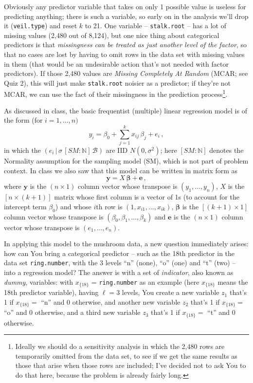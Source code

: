 \documentclass[12pt]{article}
\newcommand{\given}{\, | \,}
\begin{document}
Obviously any predictor variable that takes on only 1 possible value is useless for predicting anything; there is such a variable, so early on in the analysis we'll drop it (\texttt{veil.type}) and reset $k$ to 21. One variable -- \texttt{stalk.root} -- has a lot of missing values (2,480 out of 8,124), but one nice thing about categorical predictors is that \textit{missingness can be treated as just another level of the factor}, so that no cases are lost by having to omit rows in the data set with missing values in them (that would be an undesirable action that's not needed with factor predictors). If those 2,480 values are \textit{Missing Completely At Random} (MCAR; see Quiz 2), this will just make 
\texttt{stalk.root} noisier as a predictor; if they're not MCAR, we can use the fact of their missingness in the prediction process\footnote{Ideally we should do a sensitivity analysis in which the 2,480 rows are temporarily omitted from the data set, to see if we get the same results as those that arise when those rows are included; I've decided not to ask You to do that here, because the problem is already fairly long.}.

As discussed in class, the basic frequentist (multiple) linear regression model is of the form (for $i = 1, \dots, n )$
\begin{equation} \label{e:linear-regression-1}
y_i = \beta_0 + \sum_{ j = 1 }^k x_{ ij } \, \beta_j + e_i \, ,
\end{equation}
in which the $( e_i \given \sigma \, [ SM \! \! : \! \mathbb{ N } ] \, \mathcal{ B } )$ are IID $N ( 0, \sigma^2 )$; here $[ SM \! \! : \! \mathbb{ N } ]$ denotes the Normality assumption for the sampling model (SM), which is not part of problem context. In class we also saw that this model can be written in matrix form as
\begin{equation} \label{e:linear-regression-2}
\bm{ y } = X \, \bm{ \beta } + \bm{ e } \, ,
\end{equation} 
where $\bm{ y }$ is the $( n \times 1 )$ column vector whose transpose is $( y_1, \dots, y_n )$, $X$ is the $[ n \times ( k + 1 ) ]$ matrix whose first column is a vector of 1s (to account for the intercept term $\beta_0$) and whose $i$th row is $( 1, x_{ i1 }, \dots, x_{ ik } )$, $\bm{ \beta }$ is the $[ ( k + 1 ) \times 1 ]$ column vector whose transpose is $( \beta_0, \beta_1, \dots, \beta_k )$ and $\bm{ e }$ is the $( n \times 1 )$ column vector whose transpose is $( e_1, \dots, e_n )$. 

In applying this model to the mushroom data, a new question immediately arises: how can You bring a categorical predictor -- such as the 18th predictor in the data set \texttt{ring.number}, with the 3 levels ``n'' (none), ``o'' (one) and ``t'' (two) -- into a regression model? The answer is with a set of \textit{indicator}, also known as \textit{dummy}, variables: with $x_{ \{ 18 \} }$ = \texttt{ring.number} as an example (here $x_{ \{ 18 \} }$ means the 18th predictor variable), having $\ell = 3$ levels, You create a new variable $z_1$ that's 1 if $x_{ \{ 18 \} } =$ ``n'' and 0 otherwise, and another new variable $z_2$ that's 1 if $x_{ \{ 18 \} } =$ ``o'' and 0 otherwise, and a third new variable $z_3$ that's 1 if $x_{ \{ 18 \} } =$ ``t'' and 0 otherwise. 
\end{document}
